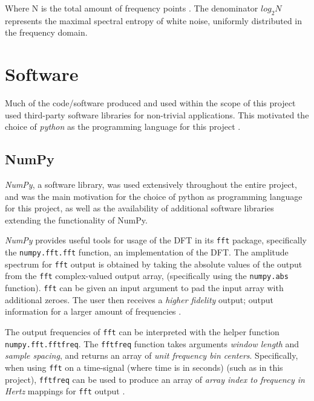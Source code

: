\documentclass{kththesis}
\begin{document}
Where N is the total amount of frequency points \parencite{SpectE}. 
The denominator \begin{math}log_2 N\end{math} represents the maximal spectral entropy of white noise, uniformly distributed in the frequency domain.

\section{Software}

Much of the code/software produced and used within the scope of this project used third-party software libraries for non-trivial applications. This motivated the choice of \textit{python} as the programming language for this project \parencite{Python}.

\subsection{NumPy}\label{NumPy BG}

\textit{NumPy}, a software library, was used extensively throughout the entire project, and was the main motivation for the choice of python as programming language for this project, as well as the availability of additional software libraries extending the functionality of NumPy.

\textit{NumPy} provides useful tools for usage of the DFT in its \texttt{fft} package, specifically the \texttt{numpy.fft.fft} function, an implementation of the DFT. 
The amplitude spectrum for \texttt{fft} output is obtained by taking the absolute values of the output from the \texttt{fft} complex-valued output array, (specifically using the \texttt{numpy.abs} function).
\texttt{fft} can be given an input argument to pad the input array with additional zeroes. 
The user then receives a \textit{higher fidelity} output; output information for a larger amount of frequencies \parencite{numpy}.

The output frequencies of \texttt{fft} can be interpreted with the helper function \texttt{numpy.fft.fftfreq}. 
The \texttt{fftfreq} function takes arguments \textit{window length} and \textit{sample spacing}, and returns an array of \textit{unit frequency bin centers}. 
Specifically, when using \texttt{fft} on a time-signal (where time is in seconds) (such as in this project), \texttt{fftfreq} can be used to produce an array of \textit{array index to frequency in Hertz} mappings for \texttt{fft} output \parencite{numpy}.
\end{document}
